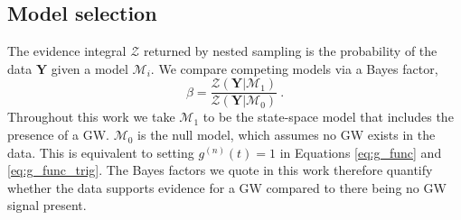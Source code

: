 \documentclass[fleqn,usenatbib,useAMS]{mnras}
\begin{document}

\subsection{Model selection}\label{sec:model_selection}
The evidence integral $\mathcal{Z}$ returned by nested sampling is the probability of the data $\boldsymbol{Y}$ given a model $\mathcal{M}_i$. We compare competing models via a Bayes factor,
\begin{equation}
	\beta = \frac{\mathcal{Z}(\boldsymbol{Y} | \mathcal{M}_1)}{\mathcal{Z}(\boldsymbol{Y} | \mathcal{M}_0)} \ . \label{eq:bayes}
\end{equation}
Throughout this work we take $\mathcal{M}_1$ to be the state-space model that includes the presence of a GW. $\mathcal{M}_0$ is the null model, which assumes no GW exists in the data. This is equivalent to setting $g^{(n)}(t)=1$ in Equations \eqref{eq:g_func} and \eqref{eq:g_func_trig}. The Bayes factors we quote in this work therefore quantify whether the data supports evidence for a GW compared to there being no GW signal present.
\end{document}
